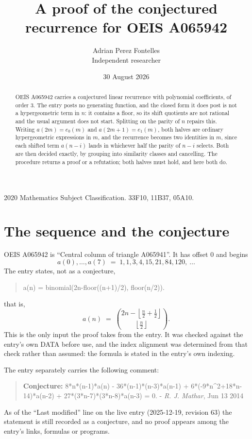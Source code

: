 \documentclass[11pt,a4paper]{article}
\title{A proof of the conjectured recurrence for OEIS A065942}
\author{Adrian Perez Fontelles\\ \small Independent researcher}
\date{30 August 2026}
\theoremstyle{plain}
\theoremstyle{definition}
\begin{document}
\maketitle

\begin{abstract}
OEIS A065942 carries a conjectured linear recurrence with polynomial coefficients, of
order 3. The entry posts no generating function, and the closed form it does post
is not a hypergeometric term in $n$: it contains a floor, so its shift quotients are not
rational and the usual argument does not start. Splitting on the parity of $n$ repairs
this. Writing $a(2m)=e_{0}(m)$ and $a(2m+1)=e_{1}(m)$, both halves are ordinary
hypergeometric expressions in $m$, and the recurrence becomes two identities in $m$, since
each shifted term $a(n-i)$ lands in whichever half the parity of $n-i$ selects. Both are
then decided exactly, by grouping into similarity classes and cancelling. The procedure
returns a proof or a refutation; both halves must hold, and here both do.
\end{abstract}

\noindent\small 2020 Mathematics Subject Classification. 33F10, 11B37, 05A10.\normalsize

\section{The sequence and the conjecture}

OEIS A065942 is ``Central column of triangle A065941''. It has offset $0$ and begins
\[
a(0),\dots,a(7)\;=\;1, 1, 3, 4, 15, 21, 84, 120,\ \dots
\]
The entry states, not as a conjecture,
\begin{quote}\small
a(n) = binomial(2n-floor((n+1)/2), floor(n/2)).
\end{quote}
that is,
\begin{equation}\label{eq:cf}
a(n)\;=\;{\binom{2 n - \left\lfloor{\frac{n}{2} + \frac{1}{2}}\right\rfloor}{\left\lfloor{\frac{n}{2}}\right\rfloor}} .
\end{equation}
This is the only input the proof takes from the entry. It was checked against the entry's
own DATA before use, and the index alignment was determined from that check rather than
assumed: the formula is stated in the entry's own indexing.

The entry separately carries the following comment:
\begin{quote}\small
\textbf{Conjecture:} 8*n*(n-1)*a(n) - 36*(n-1)*(n-3)*a(n-1) + 6*(-9*n\^{}2+18*n-14)*a(n-2) + 27*(3*n-7)*(3*n-8)*a(n-3) = 0. - \emph{R. J. Mathar}, Jun 13 2014
\end{quote}
As of the ``Last modified'' line on the live entry (2025-12-19, revision 63) the
statement is still recorded as a conjecture, and no proof appears among the entry's links,
formulas or programs.
\end{document}
